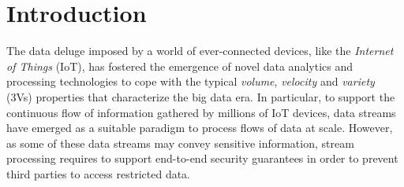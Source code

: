 \section{Introduction}\label{sec:introduction}

The data deluge imposed by a world of ever-connected devices, like the \emph{Internet of Things} (IoT), has fostered the emergence of novel data analytics and processing technologies to cope with the typical \emph{volume}, \emph{velocity} and \emph{variety} (3Vs) properties that characterize the big data era.
In particular, to support the continuous flow of information gathered by millions of IoT devices, data streams have emerged as a suitable paradigm to process flows of data at scale.
However, as some of these data streams may convey sensitive information, stream processing requires to support end-to-end security guarantees in order to prevent third parties to access restricted data.

